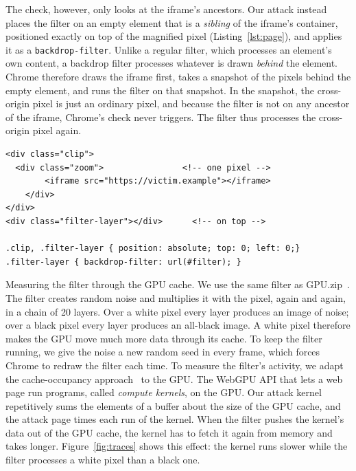 \documentclass[letterpaper,twocolumn,10pt]{article}
\makeatletter
\renewcommand\paragraph{\@startsection{paragraph}{4}{\z@}{4pt plus 1pt minus 1pt}{-0.6em}%
  {\normalfont\normalsize\bfseries}}
\makeatother
\begin{document}
The check, however, only looks at the iframe's ancestors. Our attack instead places the filter on an empty element that is a \emph{sibling} of the iframe's container, positioned exactly on top of the magnified pixel (Listing~\ref{lst:page}), and applies it as a \texttt{backdrop-filter}. Unlike a regular filter, which processes an element's own content, a backdrop filter processes whatever is drawn \emph{behind} the element. Chrome therefore draws the iframe first, takes a snapshot of the pixels behind the empty element, and runs the filter on that snapshot. In the snapshot, the cross-origin pixel is just an ordinary pixel, and because the filter is not on any ancestor of the iframe, Chrome's check never triggers. The filter thus processes the cross-origin pixel again.

\begin{lstlisting}[caption={Page structure of the attack page to bypass chrome's mitigation},label={lst:page},captionpos=b,float=t]
<div class="clip">
  <div class="zoom">                <!-- one pixel -->
        <iframe src="https://victim.example"></iframe>
    </div>
</div>
<div class="filter-layer"></div>      <!-- on top -->

.clip, .filter-layer { position: absolute; top: 0; left: 0;}
.filter-layer { backdrop-filter: url(#filter); }
\end{lstlisting}

\paragraph{Measuring the filter through the GPU cache.} We use the same filter as
GPU.zip~\cite{gpuzip}. The filter creates random noise and multiplies it with the pixel, again and again, in a chain of 20 layers. Over a white pixel every layer produces an image of noise; over a black pixel every layer produces an all-black image. A white pixel therefore makes the GPU move much more data through its cache. To keep the filter running, we give the noise a new random seed in every frame, which forces Chrome to redraw the filter each time. To measure the filter's activity, we adapt the cache-occupancy approach~\cite{shusterman2019robust} to the GPU. The WebGPU API that lets a web page run programs, called \emph{compute kernels}, on the GPU. Our attack kernel repetitively sums the elements of a buffer about the size of the GPU cache, and the attack page times each run of the kernel. When the filter pushes the kernel's data out of the GPU cache, the kernel has to fetch it again from memory and takes longer. Figure~\ref{fig:traces} shows this effect: the kernel runs slower while the filter processes a white pixel than a black one.
\end{document}

